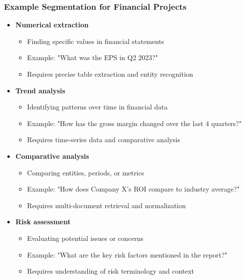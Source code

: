 {    \begin{frame}
        \frametitle{Example Segmentation for Financial Projects}
        \begin{itemize}
            \item \textbf{Numerical extraction}
            \begin{itemize}
                \item Finding specific values in financial statements
                \item Example: "What was the EPS in Q2 2023?"
                \item Requires precise table extraction and entity recognition
            \end{itemize}
            \item \textbf{Trend analysis}
            \begin{itemize}
                \item Identifying patterns over time in financial data
                \item Example: "How has the gross margin changed over the last 4 quarters?"
                \item Requires time-series data and comparative analysis
            \end{itemize}
            \item \textbf{Comparative analysis}
            \begin{itemize}
                \item Comparing entities, periods, or metrics
                \item Example: "How does Company X's ROI compare to industry average?"
                \item Requires multi-document retrieval and normalization
            \end{itemize}
            \item \textbf{Risk assessment}
            \begin{itemize}
                \item Evaluating potential issues or concerns
                \item Example: "What are the key risk factors mentioned in the report?"
                \item Requires understanding of risk terminology and context
            \end{itemize}
        \end{itemize}
    \end{frame}

}
